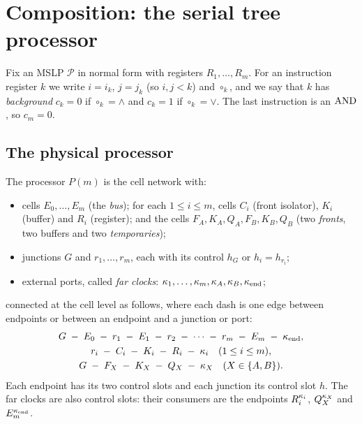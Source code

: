 \section{Composition: the serial tree processor}\label{sec:processor}

Fix an MSLP $\mathcal P$ in normal form with registers $R_1,\dots,R_m$. For an instruction register
$k$ we write $i=i_k$, $j=j_k$ (so $i,j<k$) and $\circ_k$, and we say that $k$ has
\emph{background} $c_k=0$ if $\circ_k=\wedge$ and $c_k=1$ if $\circ_k=\vee$. The last instruction
is an $\operatorname{AND}$, so $c_m=0$.

\subsection{The physical processor}\label{sec:physical}

\begin{definition}[Processor]\label{def:processor}
The processor $P(m)$ is the cell network with:
\begin{itemize}
\item cells $E_0,\dots,E_m$ (the \emph{bus}); for each $1\le i\le m$, cells $C_i$ (front isolator),
  $K_i$ (buffer) and $R_i$ (register); and the cells $F_A,K_A,Q_A,F_B,K_B,Q_B$ (two \emph{fronts},
  two buffers and two \emph{temporaries});
\item junctions $G$ and $r_1,\dots,r_m$, each with its control $h_G$ or $h_i=h_{r_i}$;
\item external ports, called \emph{far clocks}: $\kappa_1,\dots,\kappa_m,\kappa_A,\kappa_B,\kappa_{\mathrm{end}}$;
\end{itemize}
connected at the cell level as follows, where each dash is one edge between endpoints or between an
endpoint and a junction or port:
\begin{gather*}
G\;-\;E_0\;-\;r_1\;-\;E_1\;-\;r_2\;-\;\cdots\;-\;r_m\;-\;E_m\;-\;\kappa_{\mathrm{end}},\\
r_i\;-\;C_i\;-\;K_i\;-\;R_i\;-\;\kappa_i\quad(1\le i\le m),\\
G\;-\;F_X\;-\;K_X\;-\;Q_X\;-\;\kappa_X\quad(X\in\{A,B\}).
\end{gather*}
Each endpoint has its two control slots and each junction its control slot $h$. The far clocks are
also control slots: their consumers are the endpoints $R_i^{\kappa_i}$, $Q_X^{\kappa_X}$ and
$E_m^{\kappa_{\mathrm{end}}}$.
\end{definition}

